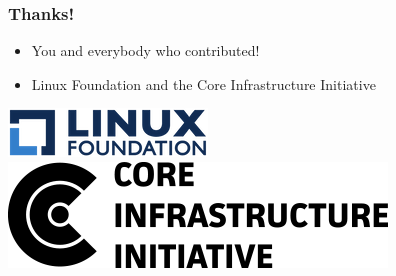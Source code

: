 \documentclass[14pt,aspectratio=169]{beamer}
\begin{document}
\begin{frame}
 \frametitle{Thanks!}

 \begin{itemize}
  \item You and everybody who contributed!
  \item Linux Foundation and the Core Infrastructure Initiative
 \end{itemize}

 \begin{center}
  \includegraphics[height=0.1\paperheight]{images/linux_foundation_logo.png}
  \hspace{0.1\paperwidth}
  \includegraphics[height=0.1\paperheight]{images/cii_logo.png}
 \end{center}

 \vfill
 \begin{center}
 \end{center}
\end{frame}
\end{document}
